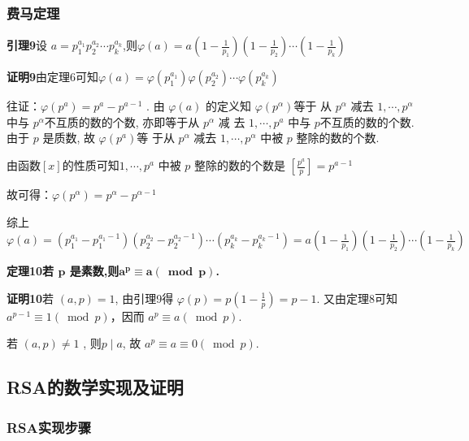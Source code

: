 \documentclass[12pt,hyperref,a4paper,UTF8]{ctexart}
\begin{document}
\subsubsection{费马定理}

\textbf{引理9}\quad 设 $ a=p_{1}^{a_{1}} p_{2}^{a_{2}} \cdots p_{k}^{a_{k}} $,则$\varphi(a)=a\left(1-\frac{1}{p_{1}}\right)\left(1-\frac{1}{p_{2}}\right) \cdots\left(1-\frac{1}{p_{k}}\right) $\par 
\vskip 2pt
\textbf{证明9}\quad 由定理6可知$\varphi(a)=\varphi\left(p_{1}^{a_{1}}\right) \varphi\left(p_{2}^{a_{2}}\right) \cdots \varphi\left(p_{k}^{a_{k}}\right)$\par 
往证：$ \varphi\left(p^{a}\right)=p^{a}-p^{a-1}$ . 由 $ \varphi(a) $ 的定义知  $\varphi\left(p^{\alpha}\right)  $等于 从 $ p^{\alpha} $ 减去  $1, \cdots, p^{\alpha} $ 中与 $ p^{\alpha}  $不互质的数的个数, 亦即等于从 $ p^{\alpha} $ 减 去 $ 1, \cdots, p^{a} $ 中与 $ p  $不互质的数的个数. 由于 $ p $ 是质数, 故  $\varphi\left(p^{a}\right)  $等 于从  $p^{\alpha}$  减去 $ 1, \cdots, p^{\alpha} $ 中被  $p $ 整除的数的个数.\par 
由函数$[x]$的性质可知$  1, \cdots, p^{a}$  中被 $ p $ 整除的数的个数是 $ \left[\frac{p^{a}}{p}\right]=p^{a-1} $\par 
故可得：$\varphi\left(p^{\alpha}\right)=p^{\alpha}-p^{\alpha-1} $\par 
综上$\varphi(a) =\left(p_{1}^{a_{1}}-p_{1}^{a_{1}-1}\right)\left(p_{2}^{a_{2}}-p_{2}^{a_{2}-1}\right) \cdots\left(p_{k}^{a_{k}}-p_{k}^{a_{k}-1}\right) =a\left(1-\frac{1}{p_{1}}\right)\left(1-\frac{1}{p_{2}}\right) \cdots\left(1-\frac{1}{p_{k}}\right) $
\vskip 12pt

\textbf{定理10}\quad \textbf{若 $\bm{ p }$ 是素数,则$\bm{  a^{p} \equiv a(\bmod p)}$.}\par 
\vskip 2pt
\textbf{证明10}\quad 若 $ (a, p)=1 $, 由引理9得 $\varphi(p)=p(1-\frac{1}{p})=p-1$. 又由定理8可知 $ a^{p-1} \equiv 1(\bmod p) $，因而 $ a^{p} \equiv a(\bmod p)$. \par
若 $ (a, p) \neq 1$ , 则$  p \mid a $, 故 $ a^{p} \equiv a\equiv 0(\bmod p) $.

\subsection{RSA的数学实现及证明}

\subsubsection{RSA实现步骤}
\end{document}
